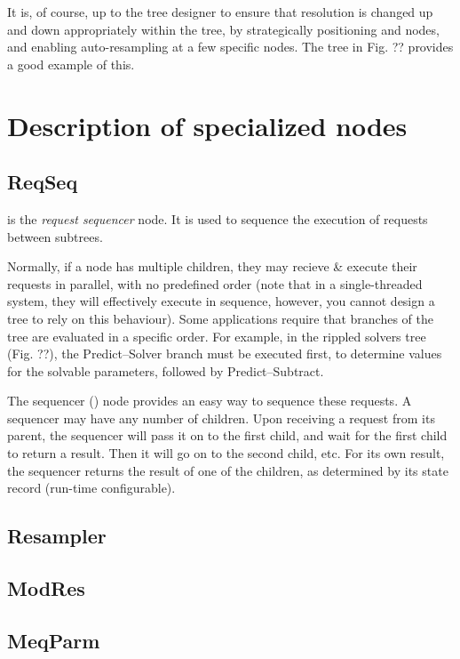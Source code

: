 \documentclass[10pt,twoside]{book}
\begin{document}
  It is, of course, up to the tree designer to ensure that resolution is
  changed up and down appropriately within the tree, by strategically
  positioning  and  nodes, and enabling
  auto-resampling at a few specific nodes. The tree in Fig. ?? provides a good
  example of this.


\chapter{Description of specialized nodes}

\section{ReqSeq}

   is the {\em request sequencer} node. It is used to sequence the
  execution of requests between subtrees.
  
  Normally, if a node has multiple children, they may recieve \& execute their
  requests in parallel, with no predefined order (note that in a
  single-threaded system, they will effectively execute in sequence, however,
  you cannot design a tree to rely on this behaviour). Some applications
  require that branches of the tree are evaluated in a specific order. For
  example, in the rippled solvers tree (Fig. ??), the Predict--Solver branch
  must be executed first, to determine values for the solvable parameters,
  followed by Predict--Subtract.
  
  The sequencer () node provides an easy way to sequence these
  requests. A sequencer may have any number of children. Upon receiving a
  request from its parent, the sequencer will pass it on to the first child,
  and wait for the first child to return a result. Then it will go on to the
  second child, etc. For its own result, the sequencer returns the result of
  one of the children, as determined by its state record (run-time
  configurable).

\section{Resampler}

\section{ModRes}

\section{MeqParm}
\end{document}
